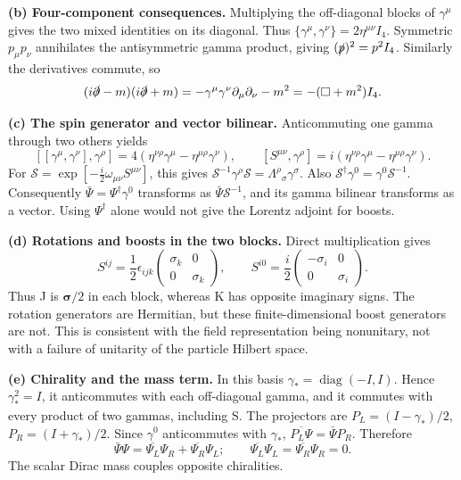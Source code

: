 \documentclass[11pt]{article}
\newcommand{\diag}{\operatorname{diag}}
\newcommand{\partsol}[2]{\par\Needspace{4\baselineskip}\medskip\noindent\textbf{(#1) #2.}\quad}
\begin{document}
\partsol{b}{Four-component consequences}
Multiplying the off-diagonal blocks of \(\gamma^\mu\) gives the two mixed
identities on its diagonal. Thus \(\{\gamma^\mu,\gamma^\nu\}=2\eta^{\mu\nu}I_4\).
Symmetric \(p_\mu p_\nu\) annihilates the antisymmetric gamma product, giving
\((\slashed p)^2=p^2I_4\). Similarly the derivatives commute, so
\[
 (i\slashed\partial-m)(i\slashed\partial+m)
 =-\gamma^\mu\gamma^\nu\partial_\mu\partial_\nu-m^2
 =-(\Box+m^2)I_4.
\]

\partsol{c}{The spin generator and vector bilinear}
Anticommuting one gamma through two others yields
\[
 [[\gamma^\mu,\gamma^\nu],\gamma^\rho]
 =4(\eta^{\nu\rho}\gamma^\mu-\eta^{\mu\rho}\gamma^\nu),\qquad
 [S^{\mu\nu},\gamma^\rho]
 =i(\eta^{\nu\rho}\gamma^\mu-\eta^{\mu\rho}\gamma^\nu).
\]
For \(\mathcal S=\exp[-\frac i2\omega_{\mu\nu}S^{\mu\nu}]\), this gives
\(\mathcal S^{-1}\gamma^\rho\mathcal S=\Lambda^\rho{}_{\sigma}\gamma^\sigma\).
Also \(\mathcal S^\dagger\gamma^0=\gamma^0\mathcal S^{-1}\).
Consequently \(\bar\Psi=\Psi^\dagger\gamma^0\) transforms as
\(\bar\Psi\mathcal S^{-1}\), and its gamma bilinear transforms as a vector.
Using \(\Psi^\dagger\) alone would not give the Lorentz adjoint for boosts.

\partsol{d}{Rotations and boosts in the two blocks}
Direct multiplication gives
\[
 S^{ij}=\frac12\epsilon_{ijk}\begin{pmatrix}\sigma_k&0\\0&\sigma_k\end{pmatrix},
 \qquad S^{i0}=\frac i2\begin{pmatrix}-\sigma_i&0\\0&\sigma_i\end{pmatrix}.
\]
Thus J is \(\bm\sigma/2\) in each block, whereas K has opposite imaginary
signs. The rotation generators are Hermitian, but these finite-dimensional
boost generators are not. This is consistent with the field representation
being nonunitary, not with a failure of unitarity of the particle Hilbert space.

\partsol{e}{Chirality and the mass term}
In this basis \(\gamma_*=\diag(-I,I)\). Hence \(\gamma_*^2=I\), it
anticommutes with each off-diagonal gamma, and it commutes with every
product of two gammas, including S. The projectors are
\(P_L=(I-\gamma_*)/2\), \(P_R=(I+\gamma_*)/2\).
Since \(\gamma^0\) anticommutes with \(\gamma_*\),
\(\overline{P_L\Psi}=\bar\Psi P_R\). Therefore
\[
 \bar\Psi\Psi=\overline{\Psi_L}\Psi_R+\overline{\Psi_R}\Psi_L;
 \qquad \overline{\Psi_L}\Psi_L=\overline{\Psi_R}\Psi_R=0.
\]
The scalar Dirac mass couples opposite chiralities.
\end{document}
